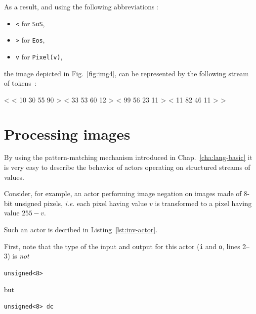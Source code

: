 As a result, and using the following abbreviations :
\begin{itemize}
\item \verb|<| for \verb|SoS|,
\item \verb|>| for \verb|Eos|,
\item \verb|v| for \verb|Pixel(v)|,
\end{itemize}

the image depicted in Fig.~\ref{fig:img4}, can be represented by the following stream of tokens~:

\begin{center}
\begin{spverbatim}
< < 10 30 55 90 > < 33 53 60 12 > < 99 56 23 11 > < 11 82 46 11 > >
\end{spverbatim}
\end{center}

\section{Processing images}
\label{sec:processing-images}

By using the pattern-matching mechanism introduced in Chap.~\ref{cha:lang-basic} it is
very easy to describe the behavior of actors operating on structured streams of values. 

\medskip
Consider, for example, an actor performing image negation on images made of 8-bit unsigned pixels,
\emph{i.e.} each pixel having value $v$ is transformed to a pixel having value $255-v$. 

Such an actor is decribed in Listing~\ref{lst:inv-actor}. 

First, note that the type of the input and output for this actor (\verb|i| and \verb|o|, lines 2--3)
is \emph{not}

\begin{center}
\verb|unsigned<8>|
\end{center}

but

\begin{center}
\verb|unsigned<8> dc|
\end{center}

